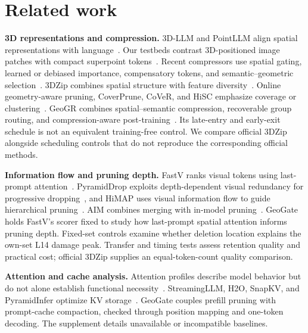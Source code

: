 \section{Related work}
\textbf{3D representations and compression.} 3D-LLM and PointLLM align spatial representations with language~\cite{hong20233dllm,xu2024pointllm}. Our testbeds contrast 3D-positioned image patches with compact superpoint tokens~\cite{zhu2024llava3d,deng20253dllava}. Recent compressors use spatial gating, learned or debiased importance, compensatory tokens, and semantic--geometric selection~\cite{wu2025adatoken3d,huang2025fast3d, lin2026efficient3d,zhang2026hcc3d,li2026segpruner,li2026geo3dpruner}. 3DZip combines spatial structure with feature diversity~\cite{baek2026zip}. Online geometry-aware pruning, CoverPrune, CoVeR, and HiSC emphasize coverage or clustering~\cite{lai2026seeing, ling2026coverprune,bui2026cover,qu2026hisc}. GeoGR combines spatial--semantic compression, recoverable group routing, and compression-aware post-training~\cite{zheng2026geogr}. Its late-entry and early-exit schedule is not an equivalent training-free control. We compare official 3DZip alongside scheduling controls that do not reproduce the corresponding official methods.

\textbf{Information flow and pruning depth.} FastV ranks visual tokens using last-prompt attention~\cite{chen2024fastv}. PyramidDrop exploits depth-dependent visual redundancy for progressive dropping~\cite{yuan2024pyramiddrop}, and HiMAP uses visual information flow to guide hierarchical pruning~\cite{yin2025himap}. AIM combines merging with in-model pruning~\cite{zhong2025aim}. GeoGate holds FastV's scorer fixed to study how last-prompt spatial attention informs pruning depth. Fixed-set controls examine whether deletion location explains the own-set L14 damage peak. Transfer and timing tests assess retention quality and practical cost; official 3DZip supplies an equal-token-count quality comparison.

\textbf{Attention and cache analysis.} Attention profiles describe model behavior but do not alone establish functional necessity~\cite{clark2019bertology,kovaleva2019bert}. StreamingLLM, H2O, SnapKV, and PyramidInfer optimize KV storage~\cite{xiao2024streamingllm,zhang2023h2o,li2024snapkv, yang2024pyramidinfer}. GeoGate couples prefill pruning with prompt-cache compaction, checked through position mapping and one-token decoding. The supplement details unavailable or incompatible baselines.
